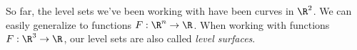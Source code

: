 \documentclass{ximera}
\begin{document}
So far, the level sets we've been working with have been curves in
$\R^2$. We can easily generalize to functions $F:\R^n \to \R$.  When
working with functions $F:\R^3\to\R$, our level sets are also called \textit{level
  surfaces}.  




%
\end{document}
